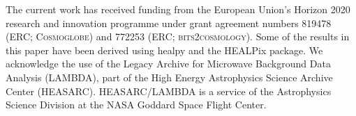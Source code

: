 \documentclass{aa}
\begin{document}
\begin{acknowledgements}
 The current work has received funding from the European
  Union’s Horizon 2020 research and innovation programme under grant
  agreement numbers 819478 (ERC; \textsc{Cosmoglobe}) and 772253 (ERC;
	\textsc{bits2cosmology}). Some of the results in this paper have been derived using healpy \citep{Zonca2019} and the HEALPix \citep{healpix} package.
  We acknowledge the use of the Legacy Archive for Microwave Background Data
  Analysis (LAMBDA), part of the High Energy Astrophysics Science Archive Center
  (HEASARC). HEASARC/LAMBDA is a service of the Astrophysics Science Division at
  the NASA Goddard Space Flight Center.  
\end{acknowledgements}


%



\end{document}
